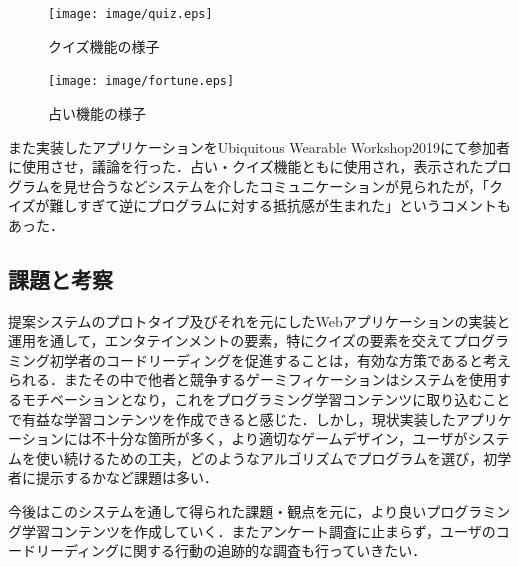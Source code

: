 \begin{figure}[H]
  \begin{center}
    \texttt{[image: image/quiz.eps]}
  \end{center}
    \vspace{-8mm} 
  \caption{クイズ機能の様子}
  \label{quiz}
\end{figure}

\begin{figure}[H]
  \begin{center}
    \texttt{[image: image/fortune.eps]}
  \end{center}
    \vspace{-8mm} 
  \caption{占い機能の様子}
  \label{fortune}
\end{figure}

また実装したアプリケーションをUbiquitous Wearable Workshop2019\cite{uww2019}にて参加者に使用させ，議論を行った．占い・クイズ機能ともに使用され，表示されたプログラムを見せ合うなどシステムを介したコミュニケーションが見られたが，「クイズが難しすぎて逆にプログラムに対する抵抗感が生まれた」というコメントもあった．




\subsection{課題と考察}

提案システムのプロトタイプ及びそれを元にしたWebアプリケーションの実装と運用を通して，エンタテインメントの要素，特にクイズの要素を交えてプログラミング初学者のコードリーディングを促進することは，有効な方策であると考えられる．またその中で他者と競争するゲーミフィケーションはシステムを使用するモチベーションとなり，これをプログラミング学習コンテンツに取り込むことで有益な学習コンテンツを作成できると感じた．しかし，現状実装したアプリケーションには不十分な箇所が多く，より適切なゲームデザイン，ユーザがシステムを使い続けるための工夫，どのようなアルゴリズムでプログラムを選び，初学者に提示するかなど課題は多い．

今後はこのシステムを通して得られた課題・観点を元に，より良いプログラミング学習コンテンツを作成していく．またアンケート調査に止まらず，ユーザのコードリーディングに関する行動の追跡的な調査も行っていきたい．
